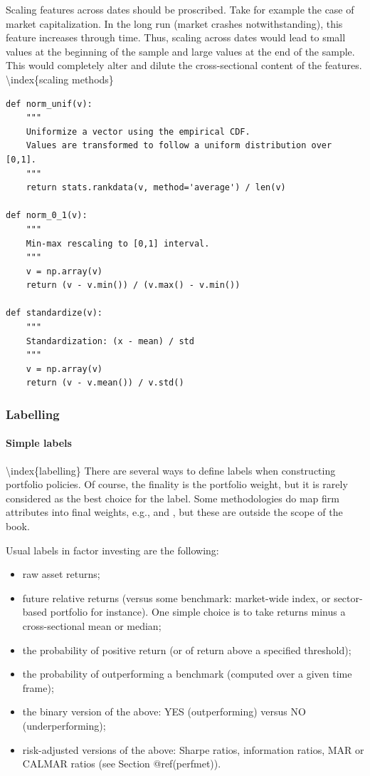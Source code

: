 Scaling features across dates should be proscribed. Take for example the case of market capitalization. In the long run (market crashes notwithstanding), this feature increases through time. Thus, scaling across dates would lead to small values at the beginning of the sample and large values at the end of the sample. This would completely alter and dilute the cross-sectional content of the features.  {\textbackslash}index\{scaling methods\}

\begin{verbatim}
def norm_unif(v):
    """
    Uniformize a vector using the empirical CDF.
    Values are transformed to follow a uniform distribution over [0,1].
    """
    return stats.rankdata(v, method='average') / len(v)

def norm_0_1(v):
    """
    Min-max rescaling to [0,1] interval.
    """
    v = np.array(v)
    return (v - v.min()) / (v.max() - v.min())

def standardize(v):
    """
    Standardization: (x - mean) / std
    """
    v = np.array(v)
    return (v - v.mean()) / v.std()
\end{verbatim}

\subsubsection{Labelling}

\paragraph{Simple labels}

{\textbackslash}index\{labelling\}
There are several ways to define labels when constructing portfolio policies. Of course, the finality is the portfolio weight, but it is rarely considered as the best choice for the label. Some methodologies do map firm attributes into final weights, e.g., \cite{brandt2009parametric} and \cite{ammann2016characteristics}, but these are outside the scope of the book.

Usual labels in factor investing are the following:

\begin{itemize}
\item raw asset returns;
\item future relative returns (versus some benchmark: market-wide index, or sector-based portfolio for instance). One simple choice is to take returns minus a cross-sectional mean or median;
\item the probability of positive return (or of return above a specified threshold);
\item the probability of outperforming a benchmark (computed over a given time frame);
\item the binary version of the above: YES (outperforming) versus NO (underperforming);
\item risk-adjusted versions of the above: Sharpe ratios, information ratios, MAR or CALMAR ratios (see Section @ref(perfmet)).
\end{itemize}

